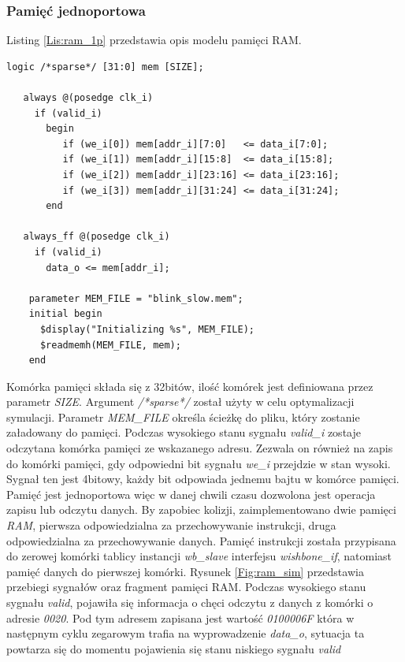 \documentclass[11pt,a4paper]{article}
\begin{document}
		\subsubsection{Pamięć jednoportowa}
			\hspace{5mm}
			Listing \ref{Lis:ram_1p} przedstawia opis modelu pamięci RAM.\\
			\begin{minipage}{\textwidth}
\begin{scriptsize}
\begin{lstlisting}[label=Lis:ram_1p,caption=Model pamięci RAM]
    logic /*sparse*/ [31:0] mem [SIZE];

   always @(posedge clk_i)
     if (valid_i)
       begin
          if (we_i[0]) mem[addr_i][7:0]   <= data_i[7:0];
          if (we_i[1]) mem[addr_i][15:8]  <= data_i[15:8];
          if (we_i[2]) mem[addr_i][23:16] <= data_i[23:16];
          if (we_i[3]) mem[addr_i][31:24] <= data_i[31:24];
       end

   always_ff @(posedge clk_i)
     if (valid_i)
       data_o <= mem[addr_i];

    parameter MEM_FILE = "blink_slow.mem";
    initial begin
      $display("Initializing %s", MEM_FILE);
      $readmemh(MEM_FILE, mem);
    end
\end{lstlisting}
\end{scriptsize}
\end{minipage}
		Komórka pamięci składa się z 32bitów, ilość komórek jest definiowana przez parametr \textit{SIZE}. Argument \textit{/*sparse*/} został użyty w celu optymalizacji symulacji. Parametr \textit{MEM\_FILE} określa ścieżkę do pliku, który zostanie załadowany do pamięci. Podczas wysokiego stanu sygnału \textit{valid\_i} zostaje odczytana komórka pamięci ze wskazanego adresu. Zezwala on również na zapis do komórki pamięci, gdy odpowiedni bit sygnału \textit{we\_i} przejdzie w stan wysoki. Sygnał ten jest 4bitowy, każdy bit odpowiada jednemu bajtu w komórce pamięci. Pamięć jest jednoportowa więc w danej chwili czasu dozwolona jest operacja zapisu lub odczytu danych. By zapobiec kolizji, zaimplementowano dwie pamięci \textit{RAM}, pierwsza odpowiedzialna za przechowywanie instrukcji, druga odpowiedzialna za przechowywanie danych. Pamięć instrukcji została przypisana do zerowej komórki tablicy instancji \textit{wb\_slave} interfejsu \textit{wishbone\_if}, natomiast pamięć danych do pierwszej komórki. Rysunek \ref{Fig:ram_sim} przedstawia przebiegi sygnałów oraz fragment pamięci RAM. Podczas wysokiego stanu sygnału \textit{valid}, pojawiła się informacja o chęci odczytu z danych z komórki o adresie \textit{0020}. Pod tym adresem zapisana jest wartość \textit{0100006F} która w następnym cyklu zegarowym trafia na wyprowadzenie \textit{data\_o}, sytuacja ta powtarza się do momentu pojawienia się stanu niskiego sygnału \textit{valid}\\
\end{document}
